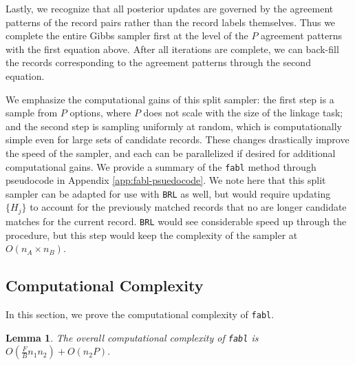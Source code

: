 \documentclass[ba]{imsart}
\newtheorem{lemma}{Lemma}
\begin{document}
Lastly, we recognize that all posterior updates are governed by the agreement patterns of the record pairs rather than the record labels themselves. Thus we complete the entire Gibbs sampler first at the level of the \(P\) agreement patterns with the first equation above. After all iterations are complete, we can back-fill the records corresponding to the agreement patterns through the second equation. 

We emphasize the computational gains of this split sampler: the first step is a sample from $P$ options, where $P$ does not scale with the size of the linkage task; and the second step is sampling uniformly at random, which is computationally simple even for large sets of candidate records. These changes drastically improve the speed of the sampler, and each can be parallelized if desired for additional computational gains. We provide a summary of the \texttt{fabl} method through pseudocode in Appendix \ref{app:fabl-psuedocode}. {\color{blue}We note here that this split sampler can be adapted for use with \texttt{BRL} as well, but would require updating $\{H_j\}$ to account for the previously matched records that no are longer candidate matches for the current record. \texttt{BRL} would see considerable speed up through the procedure, but this step would keep the complexity of the sampler at $O(n_A \times n_B)$.}

\hypertarget{computational-complexity}{%
	\subsection{Computational Complexity}\label{computational-complexity}}
In this section, we prove the computational complexity of \texttt{fabl}.

\begin{lemma}
The overall computational complexity of \texttt{fabl} is $O(\frac{F}{B} n_1 n_2) + O(n_2 P).$
\label{lemma:fabl}
\end{lemma}
\end{document}
